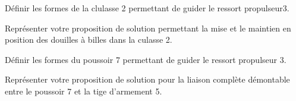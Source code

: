 \documentclass[11pt]{article}
\begin{document}
\UPSTIquestion Définir les formes de la clulasse 2 permettant de guider le ressort propulseur3.
\begin{UPSTIcorrige}
\end{UPSTIcorrige}

\UPSTIquestion Représenter votre proposition de solution permettant la mise et le maintien en position des douilles à billes dans la culasse 2. 
\begin{UPSTIcorrige}
\end{UPSTIcorrige}

\UPSTIquestion Définir les formes du poussoir 7 permettant de guider le ressort propulseur 3.

 Représenter votre proposition de solution pour la liaison complète démontable entre le poussoir 7 et la tige d'armement 5. 
\begin{UPSTIcorrige}
\end{UPSTIcorrige}


\end{document}
